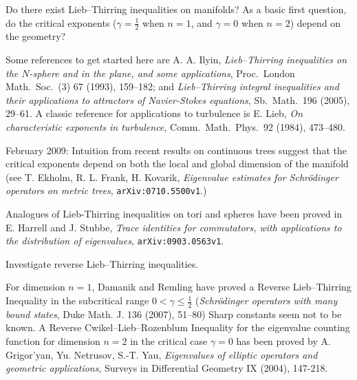 \documentclass[12pt,letterpaper, reqno]{aimpl}
\begin{document}
\begin{problemblock}
\begin{problem}[2.66]
 Do there exist Lieb--Thirring inequalities on manifolds?
As a basic first question, do the critical exponents
($\gamma=\frac{1}{2}$ when $n=1$, and $\gamma=0$ when $n=2$) depend
on the geometry?
\end{problem}

\begin{remark}
Some references to get started here are A. A. Ilyin,
\emph{Lieb--Thirring inequalities on the $N$-sphere and in the
plane, and some applications}, Proc.\ London Math.\ Soc.\ (3) 67
(1993), 159--182; and \emph{Lieb--Thirring integral inequalities and
their applications to attractors of Navier-Stokes equations}, Sb.\
Math.\ 196 (2005), 29--61. A classic reference for applications to
turbulence is E. Lieb, \emph{On characteristic exponents in
turbulence}, Comm.\ Math.\ Phys.\ 92 (1984), 473--480.
\end{remark}

\begin{remark}
February 2009: Intuition from recent results on continuous trees
suggest that the critical exponents depend on both the local and global
dimension of the manifold (see T. Ekholm, R. L. Frank, H. Kovarik,
\emph{Eigenvalue estimates for Schr\"odinger operators on metric trees},
\texttt{arXiv:0710.5500v1}.)
\end{remark}

\begin{remark}
Analogues of Lieb-Thirring inequalities on tori and spheres have been proved in E. Harrell and J. Stubbe, \emph{Trace identities for commutators, with applications to the distribution of eigenvalues},    \texttt{arXiv:0903.0563v1}.
\end{remark}

\end{problemblock}


\begin{problemblock}
\begin{problem}[2.7]
Investigate reverse Lieb--Thirring inequalities.
\end{problem}

For dimension $n=1$, Damanik and Remling have proved a
Reverse Lieb--Thirring Inequality in the subcritical range $0 <
\gamma \leq \frac{1}{2}$ (\emph{Schr\"odinger operators
with many bound states}, Duke Math. J. 136 (2007), 51--80) Sharp constants
seem not to be known. A Reverse
Cwikel--Lieb--Rozenblum Inequality for the eigenvalue counting function for dimension $n=2$ in the critical case $\gamma=0$ has been proved by A. Grigor'yan, Yu. Netrusov, S.-T. Yau, \emph{Eigenvalues of elliptic operators and geometric applications}, Surveys in Differential Geometry IX (2004), 147-218.

\end{problemblock}
\end{document}

